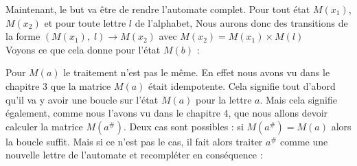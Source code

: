 \documentclass{report}
\begin{document}
Maintenant, le but va être de rendre l'automate complet. Pour tout état $M(x_{1})$, $M(x_{2})$ et pour toute lettre $l$ de l'alphabet, Nous aurons donc des transitions de la forme $(M(x_{1}),\; l) \rightarrow M(x_{2})$  avec $M(x_{2}) = M(x_{1}) \times M(l)$\\
Voyons ce que cela donne pour l'état $M(b)$ :

\begin{center}
\end{center}
$\ $\\
 
Pour $M(a)$ le traitement n'est pas le même. En effet nous avons vu dans le chapitre 3 que la matrice $M(a)$ était idempotente. Cela signifie tout d'abord qu'il va y avoir une boucle sur l'état $M(a)$ pour la lettre $a$. Mais cela signifie également, comme nous l'avons vu dans le chapitre 4, que nous allons devoir calculer la matrice $M(a^{\#})$. Deux cas sont possibles : si $M(a^{\#}) = M(a)$ alors la boucle suffit. Mais si ce n'est pas le cas, il fait alors traiter $a^{\#}$ comme une nouvelle lettre de l'automate et recompléter en conséquence : 

\begin{center}
\end{center}
$\ $\\
\end{document}
